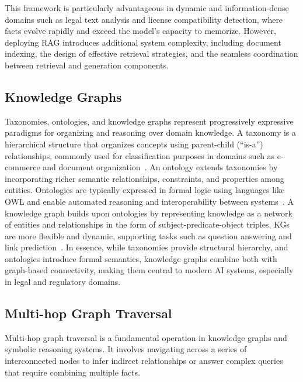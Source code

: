 This framework is particularly advantageous in dynamic and information-dense domains such as legal text analysis and license compatibility detection, where facts evolve rapidly and exceed the model's capacity to memorize. However, deploying RAG introduces additional system complexity, including document indexing, the design of effective retrieval strategies, and the seamless coordination between retrieval and generation components.




\subsection{Knowledge Graphs}
\label{sec:knowledge_graphs}

Taxonomies, ontologies, and knowledge graphs represent progressively expressive paradigms for organizing and reasoning over domain knowledge. A taxonomy is a hierarchical structure that organizes concepts using parent-child (``is-a'') relationships, commonly used for classification purposes in domains such as e-commerce and document organization~\cite{Nickerson2013Taxonomy}. An ontology extends taxonomies by incorporating richer semantic relationships, constraints, and properties among entities. Ontologies are typically expressed in formal logic using languages like OWL and enable automated reasoning and interoperability between systems~\cite{Gruber1995Ontology}. A knowledge graph  builds upon ontologies by representing knowledge as a network of entities and relationships in the form of subject-predicate-object triples. KGs are more flexible and dynamic, supporting tasks such as question answering and link 
prediction~\cite{Hogan2021KnowledgeGraphs}. In essence, while taxonomies provide structural hierarchy, and ontologies introduce formal semantics, knowledge graphs combine both with graph-based connectivity, making them central to modern AI systems, especially in legal and regulatory domains.








\subsection{Multi-hop Graph Traversal}
\label{sec:multi_hop_traversal}

Multi-hop graph traversal is a fundamental operation in knowledge graphs and symbolic reasoning systems. It involves navigating across a series of interconnected nodes to infer indirect relationships or answer complex queries that require combining multiple facts. 

